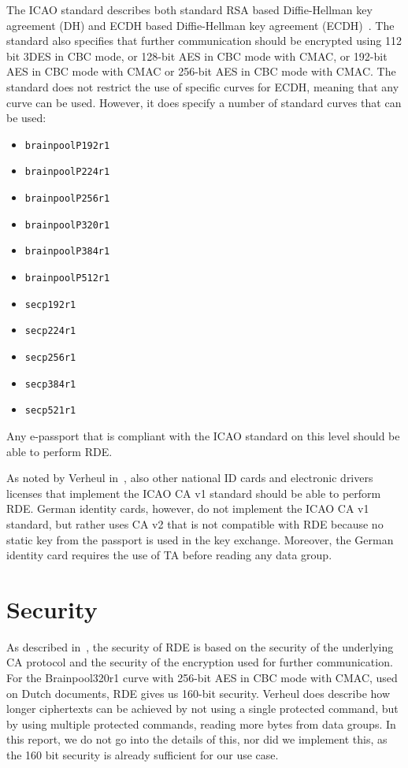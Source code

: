 The ICAO standard describes both standard RSA based Diffie-Hellman key agreement (DH) and ECDH based Diffie-Hellman key agreement (ECDH)~\cite{icao9303securitymechanisms}.
The standard also specifies that further communication should be encrypted using 112 bit 3DES in CBC mode, or 128-bit AES in CBC mode with CMAC, or 192-bit AES in CBC mode with CMAC or 256-bit AES in CBC mode with CMAC.
The standard does not restrict the use of specific curves for ECDH, meaning that any curve can be used.
However, it does specify a number of standard curves that can be used:
\begin{itemize}
    \item \texttt{brainpoolP192r1}
    \item \texttt{brainpoolP224r1}
    \item \texttt{brainpoolP256r1}
    \item \texttt{brainpoolP320r1}
    \item \texttt{brainpoolP384r1}
    \item \texttt{brainpoolP512r1}
    \item \texttt{secp192r1}
    \item \texttt{secp224r1}
    \item \texttt{secp256r1}
    \item \texttt{secp384r1}
    \item \texttt{secp521r1}
\end{itemize}
Any e-passport that is compliant with the ICAO standard on this level should be able to perform RDE.

As noted by Verheul in~\cite{verheul2017remote}, also other national ID cards and electronic drivers licenses that implement the ICAO CA v1 standard should be able to perform RDE.
German identity cards, however, do not implement the ICAO CA v1 standard, but rather uses CA v2 that is not compatible with RDE because no static key from the passport is used in the key exchange.
Moreover, the German identity card requires the use of TA before reading any data group.

\section{Security}
\label{sec:security}
As described in~\cite{verheul2017remote}, the security of RDE is based on the security of the underlying CA protocol and the security of the encryption used for further communication.
For the Brainpool320r1 curve with 256-bit AES in CBC mode with CMAC, used on Dutch documents, RDE gives us 160-bit security.
Verheul does describe how longer ciphertexts can be achieved by not using a single protected command, but by using multiple protected commands, reading more bytes from data groups.
In this report, we do not go into the details of this, nor did we implement this, as the 160 bit security is already sufficient for our use case.
